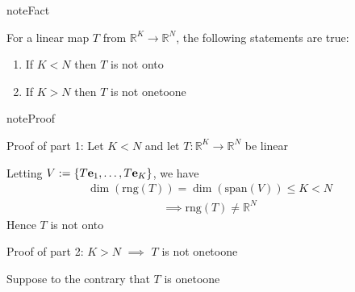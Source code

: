 \documentclass[letterpaper,10pt,english]{jupyterBook}
\begin{document}
\begin{sphinxadmonition}{note}{Fact}

\sphinxAtStartPar
For a linear map \(T\) from \(\mathbb{R}^K \to \mathbb{R}^N\), the following statements are true:
\begin{enumerate}
%
\item {} 
\sphinxAtStartPar
If \(K < N\) then \(T\) is not onto

\item {} 
\sphinxAtStartPar
If \(K > N\) then \(T\) is not one\sphinxhyphen{}to\sphinxhyphen{}one

\end{enumerate}
\end{sphinxadmonition}

\begin{sphinxadmonition}{note}{Proof}

\sphinxAtStartPar
Proof of part 1: Let \(K < N\) and let \(T \colon \mathbb{R}^K \to \mathbb{R}^N\) be linear

\sphinxAtStartPar
Letting \(V := \{T{\bf e}_1, \ldots, T{\bf e}_K\}\), we have
\begin{equation*}
\begin{split}
%
\dim(\mathrm{rng}(T)) = \dim(\mathrm{span}(V)) \leq K < N
%
\end{split}
\end{equation*}\begin{equation*}
\begin{split}
%
\implies 
\mathrm{rng}(T) \ne \mathbb{R}^N
%
\end{split}
\end{equation*}
\sphinxAtStartPar
Hence \(T\) is not onto

\sphinxAtStartPar
Proof of part 2: \(K > N\) \(\implies\) \(T\) is not one\sphinxhyphen{}to\sphinxhyphen{}one

\sphinxAtStartPar
Suppose to the contrary that \(T\) is one\sphinxhyphen{}to\sphinxhyphen{}one


\end{sphinxadmonition}
\end{document}
